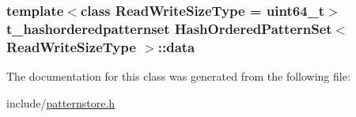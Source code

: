 \subsubsection[{data}]{\setlength{\rightskip}{0pt plus 5cm}template$<$class Read\+Write\+Size\+Type  = uint64\+\_\+t$>$ {\bf t\+\_\+hashorderedpatternset} {\bf Hash\+Ordered\+Pattern\+Set}$<$ Read\+Write\+Size\+Type $>$\+::data\hspace{0.3cm}{\ttfamily [protected]}}\label{classHashOrderedPatternSet_a04f495b51e93c8f7d6798623398e5e61}


The documentation for this class was generated from the following file\+:\begin{DoxyCompactItemize}
\item 
include/\hyperlink{patternstore_8h}{patternstore.\+h}\end{DoxyCompactItemize}
